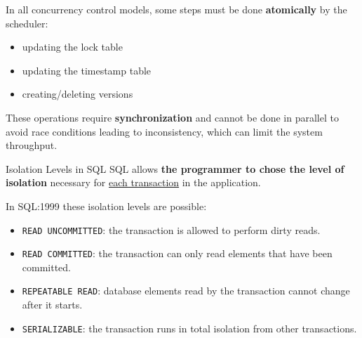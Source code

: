 %
%
\begin{frame}

In all concurrency control models, some steps must be done \textbf{atomically} by the scheduler:
\begin{itemize}[-,noitemsep]
\item updating the lock table
\item updating the timestamp table
\item creating/deleting versions
\end{itemize}

These operations require \textbf{synchronization} and cannot be done in parallel to avoid race conditions leading to inconsistency, which can limit the system throughput.
\end{frame}

%
%
\begin{frame}{Isolation Levels in SQL}
SQL allows \textbf{\alert{the programmer} to chose the level of isolation} necessary for \underline{each transaction} in the application.

In SQL:1999 these isolation levels are possible:
\begin{itemize}[-,noitemsep,topsep=-0.5em]
\item \lstinline[style=SQL]{READ UNCOMMITTED}: the transaction is allowed to perform dirty reads.
\item \lstinline[style=SQL]{READ COMMITTED}: the transaction can only read elements that have been committed.
\item \lstinline[style=SQL]{REPEATABLE READ}: database elements read by the transaction cannot change after it starts.
\item \lstinline[style=SQL]{SERIALIZABLE}: the transaction runs in total isolation from other transactions.
\end{itemize}
\end{frame}

